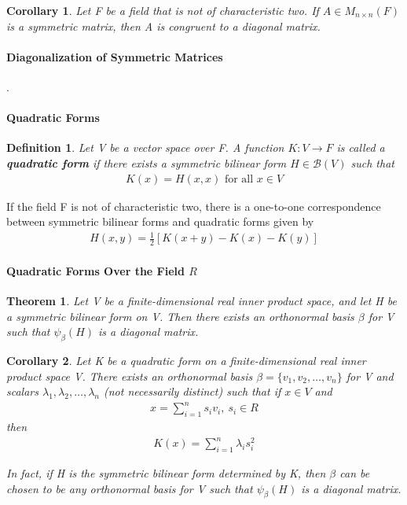 \documentclass{article}
\newcommand{\bd}[1]{\textbf{#1}}
\theoremstyle{plain}
\newtheorem{theorem}{Theorem}[section]
\newtheorem*{corollary}{Corollary}
\newtheorem*{definition1}{Definition}
\theoremstyle{plain} %
\begin{document}
\begin{corollary}
  Let F be a field that is not of characteristic two. If $A \in M_{n\times n}(F)$ is a symmetric matrix, then A is congruent to a diagonal matrix.
\end{corollary}

\paragraph{Diagonalization of Symmetric Matrices}

.

\paragraph{Quadratic Forms}

\begin{definition1}
  Let V be a vector space over F. A function $K : V \to F$ is called a \bd{quadratic form} if there exists a symmetric bilinear form $H \in \mathcal B(V)$ such that
  \begin{align*}
    K(x) = H(x, x)\text{ for all } x\in V
  \end{align*}
\end{definition1}

If the field F is not of characteristic two, there is a one-to-one correspondence between symmetric bilinear forms and quadratic forms given by 
\begin{align*}
  H(x, y) = \frac{1}{2}[K(x+y)-K(x)-K(y)]
\end{align*}

\paragraph{Quadratic Forms Over the Field $R$}

\begin{theorem}
  Let V be a finite-dimensional real inner product space, and let H be a symmetric bilinear form on V. Then there exists an orthonormal basis $\beta$ for V such that $\psi_\beta(H)$ is a diagonal matrix.
\end{theorem}

\begin{corollary}
  Let K be a quadratic form on a finite-dimensional real inner
product space V. There exists an orthonormal basis $\beta = \{v_1, v_2, \ldots , v_n\}$ for V and scalars $\lambda_1, \lambda_2, \ldots , \lambda_n$ (not necessarily distinct) such that if $x \in V$ and
\begin{align*}
  x=\sum_{i=1}^n s_iv_i,~s_i\in R
\end{align*}
then
\begin{align*}
  K(x) = \sum_{i=1}^n \lambda_i s_i^2
\end{align*}

In fact, if H is the symmetric bilinear form determined by K, then $\beta$ can be chosen to be any orthonormal basis for V such that $\psi_\beta(H)$ is a diagonal matrix.
\end{corollary}
\end{document}
